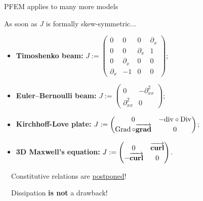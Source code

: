 \documentclass[10pt,aspectratio=43]{ISAE-Beamer}
\newcommand{\red}[1]{\textcolor{red}{#1}}
\newcommand{\curl}{\vector{\rm curl}}
\renewcommand{\div}{{\rm div}}
\DeclareMathOperator*{\Div}{Div}
\newcommand{\grad}{\vector{\rm grad}}
\DeclareMathOperator*{\Grad}{Grad}
\newcommand{\matl}{\left(\begin{matrix}}
\newcommand{\matr}{\end{matrix}\right)}
\renewcommand{\vector}[1]{\overrightarrow{\mathbf{\boldsymbol #1}}}
\newcommand{\warning}{\red{\faWarning}~}
\begin{document}
\fi




\begin{frame}{PFEM applies to many more models}

As soon as $J$ is formally skew-symmetric...

\vfill

\begin{itemize}
\item<2-> \textbf{Timoshenko beam:} 
$J := \matl 0 & 0 & 0 & \partial_x \\
			0 & 0 & \partial_x & 1 \\
			0 & \partial_x & 0 & 0 \\
			\partial_x & -1 & 0 & 0 \matr$;
\item<3-> \textbf{Euler--Bernoulli beam:} 
$J := \matl 0 & - \partial^2_{xx} \\ \partial^2_{xx} & 0 \matr$;
\item<4-> \textbf{Kirchhoff-Love plate:}
$J := \matl 0 & -\div \circ \Div \\
			\Grad \circ \grad & 0 \matr$;
\item<5-> \textbf{3D Maxwell's equation:}
$J := \matl 0 & \curl \\
			-\curl & 0 \matr$.
\end{itemize}

\vfill

\centering
\warning~Constitutive relations are \underline{postponed}!~\warning

\warning~Dissipation \textbf{is not} a drawback!~\warning

\end{frame}
\end{document}
